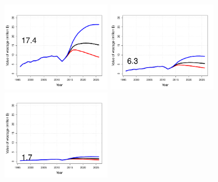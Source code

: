 \begin{figure}[htbp]
	\centering
		\includegraphics[height=1.5in]{../FIGURES/SIZELIMIT/fig_32_DI_WVal.pdf}
		\includegraphics[height=1.5in]{../FIGURES/SIZELIMIT/fig_29_DI_WVal.pdf}
		\includegraphics[height=1.5in]{../FIGURES/SIZELIMIT/fig_26_DI_WVal.pdf}
		                                                              

\end{figure}
